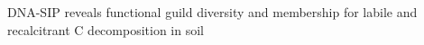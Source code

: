DNA-SIP reveals functional guild diversity and membership for labile and recalcitrant C decomposition in soil
